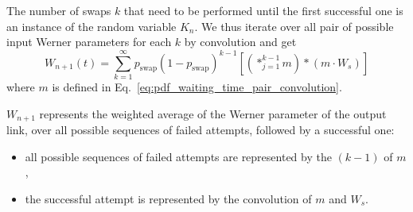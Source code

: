 \documentclass{masterthesis}
\begin{document}
The number of swaps $k$ that need to be performed until the first successful one is an instance of the random variable $K_{n}$.
We thus iterate over all pair of possible input Werner parameters for each $k$ by convolution and get
\begin{equation}\label{eq:werner_parameter_swap}
    W_{n+1}(t) = \sum_{k=1}^{\infty} p_\text{swap} {(1 - p_\text{swap})}^{k-1} \left[ \left( \ast_{j=1}^{k-1} m \right) \ast \left( m \cdot W_{s} \right) \right]
\end{equation}
where $m$ is defined in Eq.~\ref{eq:pdf_waiting_time_pair_convolution}.

$W_{n+1}$ represents the weighted average of the Werner parameter of the output link, over all possible sequences of failed attempts, followed by a successful one:
\begin{itemize}
    \item all possible sequences of failed attempts are represented by the $(k-1)$ of $m$,
    \item the successful attempt is represented by the convolution of $m$ and $W_{s}$.
\end{itemize}



        
    
\end{document}

